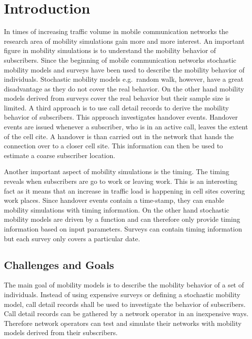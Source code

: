 \chapter{Introduction}
In times of increasing traffic volume in mobile communication networks the research area of mobility simulations gain more and more interest. An important figure in mobility simulations is to understand the mobility behavior of subscribers. Since the beginning of mobile communication networks stochastic mobility models and surveys have been used to describe the mobility behavior of individuals. 
Stochastic mobility models e.g.\ random walk, however, have a great disadvantage as they do not cover the real behavior. On the other hand mobility models derived from surveys cover the real behavior but their sample size is limited. A third approach is to use call detail records to derive the mobility behavior of subscribers.
This approach investigates handover events. Handover events are issued whenever a subscriber, who is in an active call, leaves the extent of the cell cite. A handover is than carried out in the network that hands the connection over to a closer cell site. This information can then be used to estimate a coarse subscriber location.

Another important aspect of mobility simulations is the timing. The timing reveals when subscribers are go to work or leaving work. This is an interesting fact as it means that an increase in traffic load is happening in cell sites covering work places. Since handover events contain a time-stamp, they can enable mobility simulations with timing information. On the other hand stochastic mobility models are driven by a function and can therefore only provide timing information based on input parameters. Surveys can contain timing information but each survey only covers a particular date. 



\section{Challenges and Goals}
The main goal of mobility models is to describe the mobility behavior of a set of individuals. Instead of using expensive surveys or defining a stochastic mobility model, call detail records shall be used to investigate the behavior of subscribers. Call detail records can be gathered by a network operator in an inexpensive ways. Therefore network operators can test and simulate their networks with mobility models derived from their subscribers.

